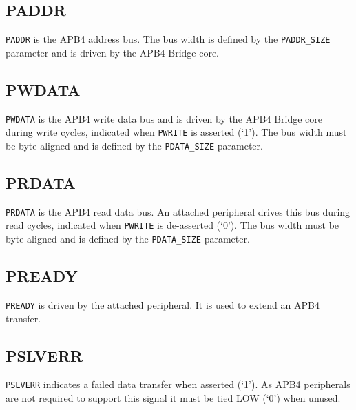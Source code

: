\subsection{PADDR}\label{paddr}

\texttt{PADDR} is the APB4 address bus. The bus width is defined by the
\texttt{PADDR\_SIZE} parameter and is driven by the APB4 Bridge core.

\subsection{PWDATA}\label{pwdata}

\texttt{PWDATA} is the APB4 write data bus and is driven by the APB4 Bridge core
during write cycles, indicated when \texttt{PWRITE} is asserted (`1'). The bus
width must be byte-aligned and is defined by the \texttt{PDATA\_SIZE} parameter.

\subsection{PRDATA}\label{prdata}

\texttt{PRDATA} is the APB4 read data bus. An attached peripheral drives this bus
during read cycles, indicated when \texttt{PWRITE} is de-asserted (`0'). The bus
width must be byte-aligned and is defined by the \texttt{PDATA\_SIZE} parameter.

\subsection{PREADY}\label{pready}

\texttt{PREADY} is driven by the attached peripheral. It is used to extend an
APB4 transfer.

\subsection{PSLVERR}\label{pslverr}

\texttt{PSLVERR} indicates a failed data transfer when asserted (`1'). As APB4
peripherals are not required to support this signal it must be tied LOW
(`0') when unused.
